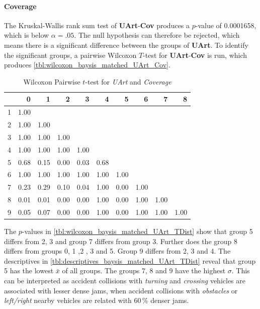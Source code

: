 \paragraph{Coverage}
The Kruskal-Wallis rank sum test of \textbf{UArt}-\textbf{Cov} produces a $p$-value of 0.0001658, which is below $\alpha=.05$. The null hypothesis can therefore be rejected, which means there is a significant difference between the groups of \textbf{UArt}. To identify the significant groups, a pairwise Wilcoxon $T$-test for \textbf{UArt}-\textbf{Cov} is run, which produces \autoref{tbl:wilcoxon_baysis_matched_UArt_Cov}.
\begin{table}[ht]
	\small
	\centering
	\begin{tabular}{rrrrrrrrrr}
		\toprule
		& 0 & 1 & 2 & 3 & 4 & 5 & 6 & 7 & 8 \\ 
		\midrule
		1 & 1.00 &  &  &  &  &  &  &  &  \\ 
		2 & 1.00 & 1.00 &  &  &  &  &  &  &  \\ 
		3 & 1.00 & 1.00 & 1.00 &  &  &  &  &  &  \\ 
		4 & 1.00 & 1.00 & 1.00 & 1.00 &  &  &  &  &  \\ 
		5 & 0.68 & 0.15 & 0.00 & 0.03 & 0.68 &  &  &  &  \\ 
		6 & 1.00 & 1.00 & 1.00 & 1.00 & 1.00 & 1.00 &  &  &  \\ 
		7 & 0.23 & 0.29 & 0.10 & 0.04 & 1.00 & 0.00 & 1.00 &  &  \\ 
		8 & 0.01 & 0.01 & 0.00 & 0.00 & 1.00 & 0.00 & 1.00 & 1.00 &  \\ 
		9 & 0.05 & 0.07 & 0.00 & 0.00 & 1.00 & 0.00 & 1.00 & 1.00 & 1.00 \\ 
		\bottomrule
	\end{tabular}
	\caption{Wilcoxon Pairwise $t$-test for \textit{UArt} and \textit{Coverage}}
	\label{tbl:wilcoxon_baysis_matched_UArt_Cov}
\end{table}
The $p$-values in \autoref{tbl:wilcoxon_baysis_matched_UArt_TDist} show that group 5 differs from 2, 3 and group 7 differs from group 3. Further does the group 8 differs from groups 0, 1 ,2 , 3 and 5. Group 9 differs from 2, 3 and 4. The descriptives in \autoref{tbl:descriptives_baysis_matched_UArt_TDist} reveal that group 5 has the lowest $\bar{x}$ of all groups. The groups 7, 8 and 9 have the highest $\sigma$. This can be interpreted as accident collisions with \textit{turning} and \textit{crossing} vehicles are associated with lesser dense jams, when accident collisions with \textit{obstacles} or \textit{left/right} nearby vehicles are related with 60\,\% denser jams.
